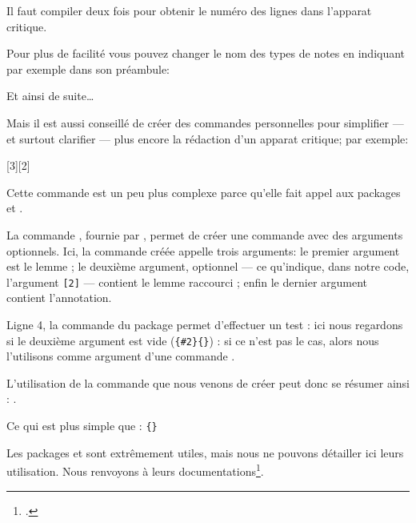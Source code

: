 \begin{attention}
Il faut compiler deux fois pour obtenir le numéro des lignes dans l'apparat critique.
\end{attention}



Pour plus de facilité vous pouvez changer le nom des types de notes en indiquant par exemple dans son préambule: 
\begin{latexcode}
\let\variantes\Afootnote
\let\citations\Bfootnote
\let\eclaircissements\footnoteA
Et ainsi de suite…
\end{latexcode}

\label{commandevariante}Mais il est aussi conseillé de créer des commandes personnelles pour simplifier   --- et surtout clarifier --- plus encore la rédaction d'un apparat critique; par exemple:

\begin{latexcode}
\usepackage{ifthen, xargs}
[3][2]{%
    }
\end{latexcode}

Cette commande est un peu plus complexe parce qu'elle fait appel aux packages  et . 

La commande , fournie par , permet de créer une commande avec des arguments optionnels. Ici, la commande créée appelle trois arguments: le premier argument est le lemme ; le deuxième argument, optionnel --- ce qu'indique,  dans notre code, l'argument \verb=[2]= --- contient le lemme raccourci ; enfin le dernier argument contient l'annotation.

Ligne 4, la commande  du package  permet d'effectuer un test : ici nous regardons si le deuxième argument est vide (\verb={#2}{}=) : si ce n'est pas le cas, alors nous l'utilisons  comme argument d'une commande .

 L'utilisation de la commande que nous venons de créer peut donc se résumer ainsi : 
 . 

Ce qui est  plus simple que :
\verb|{|\verb|}|

\begin{plusloins}
Les packages  et  sont extrêmement utiles, mais nous ne pouvons détailler ici leurs utilisation. Nous renvoyons à leurs documentations\footcites{ifthen}{xargs}.
\end{plusloins}





